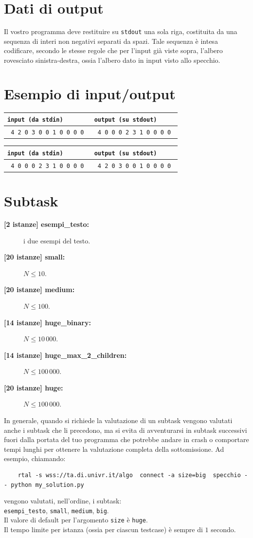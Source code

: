 \documentclass[a4paper,11pt]{article}
\newcommand{\file}[1]{\texttt{#1}}
\newcommand{\esempio}[2]{
\noindent\begin{minipage}{\textwidth}
\begin{tabular}{|p{11cm}|p{5cm}|}
	\hline
      \textbf{\file{input (da stdin)}} & \textbf{\file{output (su stdout)}}\\
	\hline
	\tt \small #1 &
	\tt \small #2 \\
	\hline
\end{tabular}
\end{minipage}
}
\begin{document}
\section*{Dati di output}

Il vostro programma deve restituire su \verb'stdout' una sola riga, costituita da una sequenza di interi non negativi separati da spazi. Tale sequenza è intesa codificare, secondo le stesse regole che per l'input già viste sopra, l'albero rovesciato sinistra-destra, ossia l'albero dato in input visto allo specchio.

\section*{Esempio di input/output}
\esempio{
4 2 0 3 0 0 1 0 0 0 0
}{
4 0 0 0 2 3 1 0 0 0 0
}

\esempio{
4 0 0 0 2 3 1 0 0 0 0
}{
4 2 0 3 0 0 1 0 0 0 0
}


\section*{Subtask}
\begin{description}
\item[\textbf{\hspace{1ex}[2 istanze] esempi\_testo:}] i due esempi del testo.
\item [\textbf{[20 istanze] small:}] $N \le 10$.
\item [\textbf{[20 istanze] medium:}] $N \le 100$.
\item [\textbf{[14 istanze] huge\_binary:}] $N \le 10\,000$.
\item [\textbf{[14 istanze] huge\_max\_2\_children:}] $N \le 100\,000$.
\item [\textbf{[20 istanze] huge:}] $N \le 100\,000$.
\end{description}

In generale, quando si richiede la valutazione di un subtask vengono valutati anche i subtask che li precedono, ma si evita di avventurarsi in subtask successivi  fuori dalla portata del tuo programma che potrebbe andare in crash o comportare tempi lunghi per ottenere la valutazione completa della sottomissione. Ad esempio, chiamando:

\begin{verbatim}
    rtal -s wss://ta.di.univr.it/algo  connect -a size=big  specchio -- python my_solution.py
\end{verbatim}

\noindent
vengono valutati, nell'ordine, i subtask:\\

{\tt esempi\_testo}, {\tt small}, {\tt medium}, {\tt big}.\\

\noindent
Il valore di default per l'argomento {\tt size} è {\tt huge}.\\

\noindent
Il tempo limite per istanza (ossia per ciascun testcase) è sempre di $1$ secondo.
\end{document}
